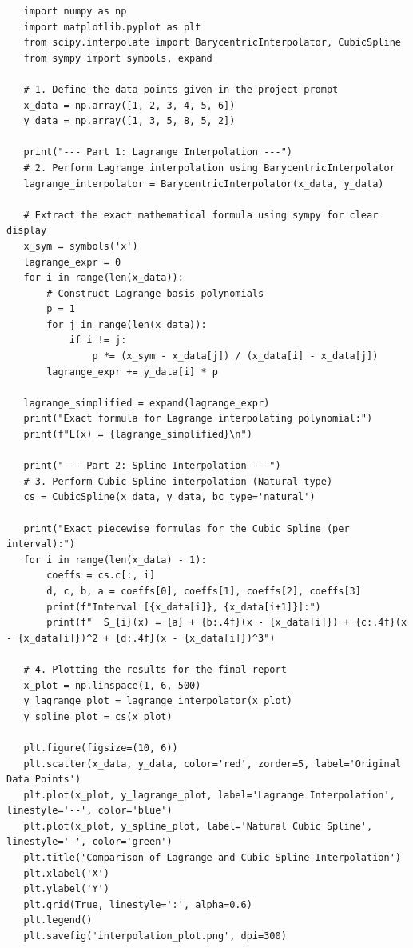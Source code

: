  \begin{latin}
  \begin{lstlisting}
   import numpy as np
   import matplotlib.pyplot as plt
   from scipy.interpolate import BarycentricInterpolator, CubicSpline
   from sympy import symbols, expand
   
   # 1. Define the data points given in the project prompt
   x_data = np.array([1, 2, 3, 4, 5, 6])
   y_data = np.array([1, 3, 5, 8, 5, 2])
   
   print("--- Part 1: Lagrange Interpolation ---")
   # 2. Perform Lagrange interpolation using BarycentricInterpolator
   lagrange_interpolator = BarycentricInterpolator(x_data, y_data)
   
   # Extract the exact mathematical formula using sympy for clear display
   x_sym = symbols('x')
   lagrange_expr = 0
   for i in range(len(x_data)):
       # Construct Lagrange basis polynomials
       p = 1
       for j in range(len(x_data)):
           if i != j:
               p *= (x_sym - x_data[j]) / (x_data[i] - x_data[j])
       lagrange_expr += y_data[i] * p
   
   lagrange_simplified = expand(lagrange_expr)
   print("Exact formula for Lagrange interpolating polynomial:")
   print(f"L(x) = {lagrange_simplified}\n")
   
   print("--- Part 2: Spline Interpolation ---")
   # 3. Perform Cubic Spline interpolation (Natural type)
   cs = CubicSpline(x_data, y_data, bc_type='natural')
   
   print("Exact piecewise formulas for the Cubic Spline (per interval):")
   for i in range(len(x_data) - 1):
       coeffs = cs.c[:, i]
       d, c, b, a = coeffs[0], coeffs[1], coeffs[2], coeffs[3]
       print(f"Interval [{x_data[i]}, {x_data[i+1]}]:")
       print(f"  S_{i}(x) = {a} + {b:.4f}(x - {x_data[i]}) + {c:.4f}(x - {x_data[i]})^2 + {d:.4f}(x - {x_data[i]})^3")
			
   # 4. Plotting the results for the final report
   x_plot = np.linspace(1, 6, 500)
   y_lagrange_plot = lagrange_interpolator(x_plot)
   y_spline_plot = cs(x_plot)
			
   plt.figure(figsize=(10, 6))
   plt.scatter(x_data, y_data, color='red', zorder=5, label='Original Data Points')
   plt.plot(x_plot, y_lagrange_plot, label='Lagrange Interpolation', linestyle='--', color='blue')
   plt.plot(x_plot, y_spline_plot, label='Natural Cubic Spline', linestyle='-', color='green')
   plt.title('Comparison of Lagrange and Cubic Spline Interpolation')
   plt.xlabel('X')
   plt.ylabel('Y')
   plt.grid(True, linestyle=':', alpha=0.6)
   plt.legend()
   plt.savefig('interpolation_plot.png', dpi=300)
  \end{lstlisting}
 \end{latin}
	
